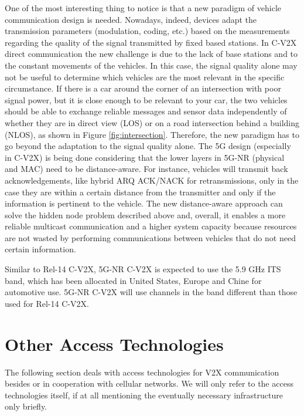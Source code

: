 \documentclass[conference,12pt,onecolumn]{IEEEtran}
\begin{document}
One of the most interesting thing to notice is that a new paradigm of vehicle communication design is needed. Nowadays, indeed, devices adapt the transmission parameters (modulation, coding, etc.) based on the measurements regarding the quality of the signal transmitted by fixed based stations. In C-V2X direct communication the new challenge is due to the lack of base stations and to the constant movements of the vehicles. In this case, the signal quality alone may not be useful to determine which vehicles are the most relevant in the specific circumstance. If there is a car around the corner of an intersection with poor signal power, but it is close enough to be relevant to your car, the two vehicles should be able to exchange reliable messages and sensor data independently of whether they are in direct view (LOS) or on a road intersection behind a building (NLOS), as shown in Figure \ref{fig:intersection}. Therefore, the new paradigm has to go beyond the adaptation to the signal quality alone. The 5G design (especially in C-V2X) is being done considering that the lower layers in 5G-NR (physical and MAC) need to be distance-aware. For instance, vehicles will transmit back acknowledgements, like hybrid ARQ ACK/NACK for retransmissions, only in the case they are within a certain distance from the transmitter and only if the information is pertinent to the vehicle. The new distance-aware approach can solve the hidden node problem described above and, overall, it enables a more reliable multicast communication and a higher system capacity because resources are not wasted by performing communications between vehicles that do not need certain information.

Similar to Rel-14 C-V2X, 5G-NR C-V2X is expected to use the 5.9 GHz ITS band, which has been allocated in United States, Europe and Chine for automotive use. 5G-NR C-V2X will use channels in the band different than those used for Rel-14 C-V2X. \cite{5GAAwhite}






\section{Other Access Technologies}
The following section deals with access technologies for V2X communication besides or in cooperation with cellular networks. We will only refer to the access technologies itself, if at all mentioning the eventually necessary infrastructure only briefly.
\end{document}
